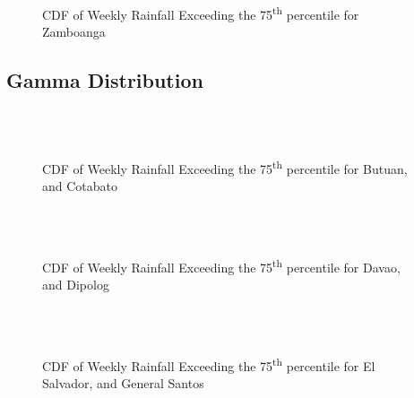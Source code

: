 \begin{figure}[H]
  \centering
  \\
  \caption{CDF of Weekly Rainfall Exceeding the 75\textsuperscript{th} percentile for Zamboanga}
  \label{fig:weekly_0.90_appendix_gb_pt6}
\end{figure}

\subsection{Gamma Distribution}

\begin{figure}[H]
  \centering
  \\
  \\
  \caption{CDF of Weekly Rainfall Exceeding the 75\textsuperscript{th} percentile for Butuan, and Cotabato}
  \label{fig:weekly_0.90_appendix_gd_pt1}
\end{figure}

\begin{figure}[H]
  \centering
  \\
  \\
  \caption{CDF of Weekly Rainfall Exceeding the 75\textsuperscript{th} percentile for Davao, and Dipolog}
  \label{fig:weekly_0.90_appendix_gd_pt2}
\end{figure}

\begin{figure}[H]
  \centering
  \\
  \\
  \caption{CDF of Weekly Rainfall Exceeding the 75\textsuperscript{th} percentile for El Salvador, and General Santos}
  \label{fig:weekly_0.90_appendix_gd_pt3}
\end{figure}

